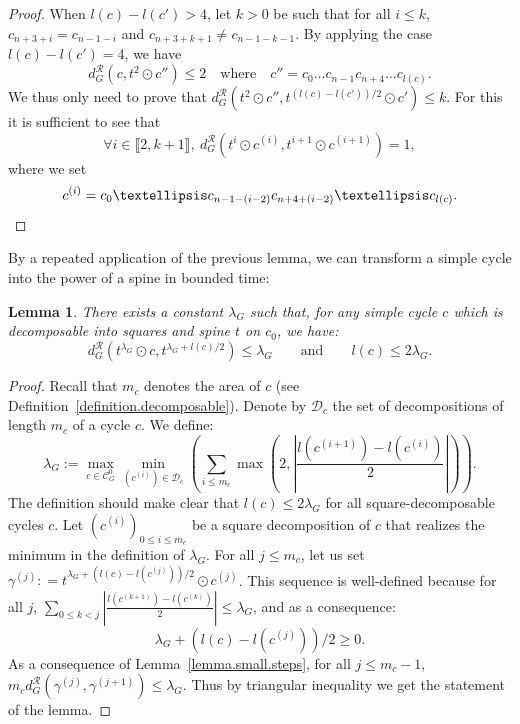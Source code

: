 \documentclass{article}
\newtheorem{lemma}[theorem]{Lemma}
\begin{document}
\begin{proof}
When $l(c)-l(c') > 4$, let $k>0$ be such that for all $i \le k$, 
$c_{n+3+i}=c_{n-1-i}$ and $c_{n+3+k+1} \neq c_{n-1-k-1}$. By applying the case $l(c)-l(c')=4$, we have
\[d_G^{\mathcal{R}}(c,t^2 \odot c'')\le 2 \quad \text{where} \quad c''= c_0 \ldots c_{n-1} c_{n+4} \ldots c_{l(c)}.
\]
We thus only need to prove that $d_G^{\mathcal{R}}(t^2 \odot c'', t^{(l(c)-l(c'))/2} \odot c') \le k$. For this it is sufficient to see 
that
\[\forall i \in \llbracket 2, k+1\rrbracket,\ d_G^{\mathcal{R}}(t^{i} \odot c^{(i)}, t^{i+1} \odot c^{(i+1)})=1,\]
where we set 
\[c^{(i)} = c_0 \ldots c_{n-1-(i-2)} c_{n+4+(i-2)} \ldots c_{l(c)}.\qedhere\]
\end{proof}


By a repeated application of the previous lemma, we can transform a simple cycle into the power of a spine in bounded time:

\begin{lemma}\label{lemma.cycle.reduction}There exists a constant $\lambda_G$ such that, for any simple cycle $c$ which is decomposable into squares and spine $t$ on $c_0$, we have:
\[d^{\mathcal{R}}_G(t^{\lambda_G} \odot c, t^{\lambda_G +l(c)/2}) \le \lambda_G \qquad\text{and} \qquad l(c)\leq 2\lambda_G.\]
\end{lemma}

\begin{proof}
Recall that $m_c$ denotes the area of $c$ (see Definition~\ref{definition.decomposable}).
Denote by $\mathcal{D}_c$ the set of decompositions of length $m_c$ of a cycle $c$.
We define: 
\[\lambda_G := \max_{c \in \mathcal{C}_G^0} \min_{\left( c^{(i)}\right) \in \mathcal{D}_c} \left(\sum_{i \le m_c} \max \left(2, \left|\frac{l(c^{(i+1)})-l(c^{(i)})}{2}\right|\right)\right).\]
The definition should make clear that $l(c)\leq 2\lambda_G$ for all square-decomposable cycles $c$.
Let $(c^{(i)})_{0\le i\le m_c}$ be a square decomposition of $c$ that realizes the minimum in the definition of $\lambda_G$.
For all $j \le m_c$, let us set $\gamma^{(j)} : = t^{\lambda_G + (l(c) - l(c^{(j)}))/2} \odot c^{(j)}$. This sequence is well-defined because for all $j$, $\sum_{0\leq k< j}\left|\frac{l(c^{(k+1)})-l(c^{(k)})}{2} \right| \le \lambda_G$, and as a consequence:
\[\lambda_G + (l(c) - l(c^{(j)}))/2 \ge 0.\]
As a consequence of Lemma~\ref{lemma.small.steps}, for all $j \le m_c-1$, $m_c d^{\mathcal{R}}_G (\gamma^{(j)},\gamma^{(j+1)}) \le \lambda_G$. 
Thus by triangular inequality we get the statement of the lemma.
\end{proof}
\end{document}
